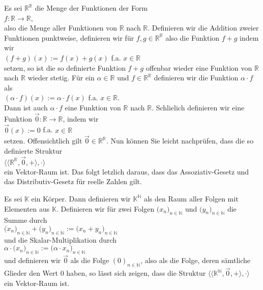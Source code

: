 \example
Es sei $\mathbb{R}^{\mathbb{R}}$ die Menge der Funktionen der Form
\\[0.2cm]
\hspace*{1.3cm}
 $f: \mathbb{R} \rightarrow \mathbb{R}$,
\\[0.2cm]
also die Menge aller Funktionen von $\mathbb{R}$ nach $\mathbb{R}$.
Definieren wir die Addition zweier Funktionen punktweise, definieren wir f\"{u}r $f,g \in \mathbb{R}^{\mathbb{R}}$ also die
Funktion $f+g$ indem wir
\\[0.2cm]
\hspace*{1.3cm}
$(f+g)(x) := f(x) + g(x)$  \quad f.a. $x \in \mathbb{R}$
\\[0.2cm]
setzen, so ist die so definierte Funktion $f + g$ offenbar wieder eine Funktion von
$\mathbb{R}$ nach $\mathbb{R}$ wieder stetig.  F\"{u}r ein $\alpha \in \mathbb{R}$ und
$f \in\mathbb{R}^{\mathbb{R}}$ definieren wir die Funktion $\alpha \cdot f$ als
\\[0.2cm]
\hspace*{1.3cm}
$(\alpha \cdot f)(x) := \alpha \cdot f(x)$ \quad f.a. $x \in \mathbb{R}$.
\\[0.2cm]
Dann ist auch  $\alpha \cdot f$ eine Funktion von $\mathbb{R}$ nach $\mathbb{R}$.  
Schlie\3lich definieren wir eine Funktion
 $\vec{0}:\mathbb{R} \rightarrow \mathbb{R}$, indem wir
\\[0.2cm]
\hspace*{1.3cm}
$\vec{0}(x) := 0$ \quad f.a. $x \in \mathbb{R}$ 
\\[0.2cm]
setzen.  Offensichtlich  gilt $\vec{0} \in \mathbb{R}^{\mathbb{R}}$.  Nun k\"{o}nnen Sie
leicht nachpr\"{u}fen, dass die so definierte Struktur
\\[0.2cm]
\hspace*{1.3cm}
$\bigl\langle \langle \mathbb{R}^{\mathbb{R}}, \vec{0}, + \rangle, \cdot \bigr\rangle$
\\[0.2cm]
ein Vektor-Raum ist.  Das folgt letzlich daraus, dass das Assoziativ-Gesetz und das Distributiv-Gesetz f\"{u}r reelle Zahlen
gilt.
 \eoxs

\example
Es sei $\mathbb{K}$ ein K\"{o}rper.  Dann definieren wir $\mathbb{K}^\mathbb{N}$ als den Raum aller
Folgen mit Elementen aus $\mathbb{K}$.  Definieren wir f\"{u}r zwei
Folgen
$\bigl(x_n\bigr)_{n\in\mathbb{N}}$ und $\bigl(y_n\bigr)_{n\in\mathbb{N}}$ die Summe durch
\\[0.2cm]
\hspace*{1.3cm}
$\bigl(x_n\bigr)_{n\in\mathbb{N}} + \bigl(y_n\bigr)_{n\in\mathbb{N}} := \bigl(x_n + y_n\bigr)_{n\in\mathbb{N}}$ 
\\[0.2cm]
und die Skalar-Multiplikation durch
\\[0.2cm]
\hspace*{1.3cm}
$\alpha \cdot \bigl(x_n\bigr)_{n\in\mathbb{N}} := \bigl(\alpha \cdot x_n \bigr)_{n\in\mathbb{N}}$
\\[0.2cm]
und definieren wir $\vec{0}$ als die Folge $(0)_{n\in\mathbb{N}}$, also als die Folge,
deren s\"{a}mtliche Glieder den Wert $0$ haben, so l\"{a}sst sich zeigen, dass die Struktur
 $\bigl\langle\langle\mathbb{K}^\mathbb{N}, \vec{0}, +\rangle, \cdot\rangle$  ein Vektor-Raum ist.
\eox


